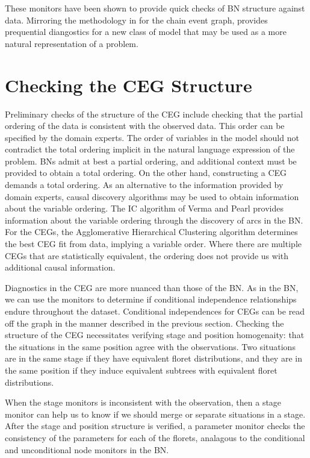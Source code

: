 \documentclass[12pt]{article}
\begin{document}
These monitors have been shown to provide quick checks of BN structure against data. %
Mirroring the methodology in \cite{diagnostics} for the chain event graph, provides prequential diangostics for a new class of model that may be used as a more natural representation of a problem. 

\section{Checking the CEG Structure}

Preliminary checks of the structure of the CEG include checking that the partial ordering of the data is consistent with the observed data. This order can be specified by the domain experts. The order of variables in the model should not contradict the total ordering implicit in the natural language expression of the problem. BNs admit at best a partial ordering, and additional context must be provided to obtain a total ordering. On the other hand, constructing a CEG demands a total ordering.
As an alternative to the information provided by domain experts, causal discovery algorithms may be used to obtain information about the variable ordering. The IC algorithm of Verma and Pearl provides information about the variable ordering through the discovery of arcs in the BN. For the CEGs, the Agglomerative Hierarchical Clustering algorithm determines the best CEG fit from data, implying a variable order.  Where there are multiple CEGs that are statistically equivalent, the ordering does not provide us with additional causal information. %

Diagnostics in the CEG are more nuanced than those of the BN. As in the BN, we can use the monitors to determine if conditional independence relationships endure throughout the dataset. Conditional independences for CEGs can be read off the graph in the manner described in the previous section. %
Checking the structure of the CEG necessitates verifying stage and position homogenaity: that the situations in the same position agree with the observations. Two situations are in the same stage if they have equivalent floret distributions, and they are in the same position if they induce equivalent subtrees with equivalent floret distributions. 

When the stage monitors is inconsistent with the observation, then a stage monitor can help us to know if we should merge or separate situations in a stage. 
After the stage and position structure is verified, a parameter monitor checks the consistency of the parameters for each of the florets, analagous to the conditional and unconditional node monitors in the BN. 
 
\end{document}
